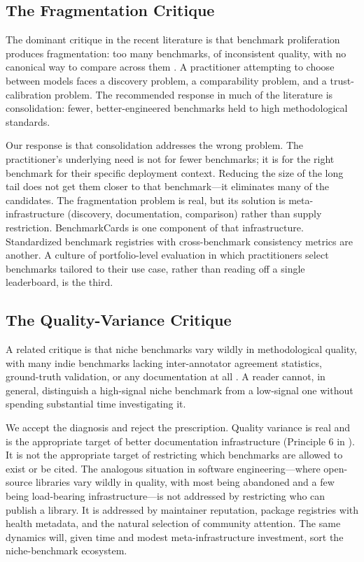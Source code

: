 \documentclass[11pt,a4paper]{article}
\begin{document}
\subsection{The Fragmentation Critique}
\label{sec:fragmentation}

The dominant critique in the recent literature is that benchmark proliferation produces fragmentation: too many benchmarks, of inconsistent quality, with no canonical way to compare across them \citep{benchmarking_se2025,qian2026benchmark2}. A practitioner attempting to choose between models faces a discovery problem, a comparability problem, and a trust-calibration problem. The recommended response in much of the literature is consolidation: fewer, better-engineered benchmarks held to high methodological standards.

Our response is that consolidation addresses the wrong problem. The practitioner's underlying need is not for fewer benchmarks; it is for the right benchmark for their specific deployment context. Reducing the size of the long tail does not get them closer to that benchmark---it eliminates many of the candidates. The fragmentation problem is real, but its solution is meta-infrastructure (discovery, documentation, comparison) rather than supply restriction. BenchmarkCards \citep{sokol2024benchmarkcards} is one component of that infrastructure. Standardized benchmark registries with cross-benchmark consistency metrics \citep{benchbench2026} are another. A culture of portfolio-level evaluation in which practitioners select benchmarks tailored to their use case, rather than reading off a single leaderboard, is the third.

\subsection{The Quality-Variance Critique}
\label{sec:quality}

A related critique is that niche benchmarks vary wildly in methodological quality, with many indie benchmarks lacking inter-annotator agreement statistics, ground-truth validation, or any documentation at all \citep{liu2025survey,linegoesup2025}. A reader cannot, in general, distinguish a high-signal niche benchmark from a low-signal one without spending substantial time investigating it.

We accept the diagnosis and reject the prescription. Quality variance is real and is the appropriate target of better documentation infrastructure (Principle 6 in ). It is not the appropriate target of restricting which benchmarks are allowed to exist or be cited. The analogous situation in software engineering---where open-source libraries vary wildly in quality, with most being abandoned and a few being load-bearing infrastructure---is not addressed by restricting who can publish a library. It is addressed by maintainer reputation, package registries with health metadata, and the natural selection of community attention. The same dynamics will, given time and modest meta-infrastructure investment, sort the niche-benchmark ecosystem.
\end{document}
